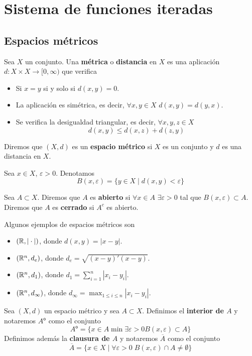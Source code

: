 \documentclass[FyPI.tex]{subfiles}
\newcommand*\interior[1]{#1^{\mathsf{o}}}
\begin{document}
\chapter{Sistema de funciones iteradas}
\section{Espacios métricos}
\begin{defi}
Sea $X$ un conjunto. Una \textbf{métrica} o \textbf{distancia }en $X$ es una aplicación $d: X\times X \to [0,\infty)$ que verifica
\begin{itemize}
\item Si $x=y$ si y solo si $d(x,y)=0$.
\item La aplicación es simétrica, es decir, $\forall x,y\in X$ $d(x,y)=d(y,x)$.
\item Se verifica la desigualdad triangular, es decir, $\forall x,y,z \in X$ 
$$
d(x,y)\leq d(x,z)+d(z,y)
$$
\end{itemize}
\end{defi}
\begin{defi}
Diremos que $(X,d)$ es un \textbf{espacio métrico} si $X$ es un conjunto y $d$ es una distancia en $X$.
\end{defi}
\begin{nota}
Sea $x\in X$, $\varepsilon >0$. Denotamos
$$
B(x,\varepsilon) = \{y \in X \mid d(x,y)<\varepsilon\}
$$
\end{nota}
\begin{defi}
Sea $A\subset X$. Diremos que $A$ es \textbf{abierto} si $\forall x \in A$ $\exists \varepsilon>0$ tal que $B(x,\varepsilon)\subset A$. Diremos que $A$ es \textbf{cerrado} si $A^c$ es abierto.
\end{defi}
\begin{example}
Algunos ejemplos de espacios métricos son 
\begin{itemize}
\item $(\mathbb{R},|\cdot|)$, donde $d(x,y)=|x-y|$.
\item $(\mathbb{R}^n,d_e)$, donde $d_e = \sqrt{(x-y)'(x-y)}$.
\item $(\mathbb{R}^n,d_1)$, donde $d_1 = \sum_{i=1}^n |x_i-y_i|$.
\item $(\mathbb{R}^n,d_\infty)$, donde $d_\infty = \max_{1\leq i \leq n} |x_i-y_i|$.
\end{itemize}
\end{example}
\begin{defi}
Sea $(X,d)$ un espacio métrico y sea $A\subset X$. Definimos el \textbf{interior de $A$} y notaremos $\interior{A}$ como el conjunto
$$
\interior{A} = \{x\in A \min \exists \varepsilon >0 B(x,\varepsilon)\subset A\}
$$
Definimos además la \textbf{clausura de $A$} y notaremos $\overline{A}$ como el conjunto
$$
\overline{A} = \{ x\in X \mid \forall \varepsilon > 0 \; B(x,\varepsilon)\cap A \neq \emptyset\}
$$
\end{defi}
\end{document}
